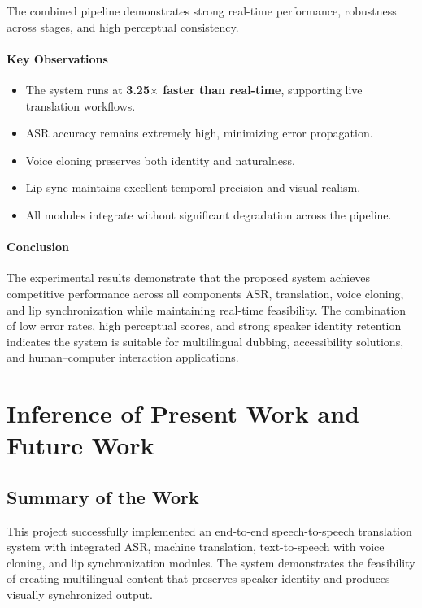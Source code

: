\documentclass[12pt,oneside]{report}
\begin{document}
The combined pipeline demonstrates strong real-time performance, robustness across stages, and high perceptual consistency.

\subsubsection*{Key Observations}

\begin{itemize}
    \item The system runs at \textbf{3.25$\times$ faster than real-time}, supporting live translation workflows.
    \item ASR accuracy remains extremely high, minimizing error propagation.
    \item Voice cloning preserves both identity and naturalness.
    \item Lip-sync maintains excellent temporal precision and visual realism.
    \item All modules integrate without significant degradation across the pipeline.
\end{itemize}

\subsubsection*{Conclusion}

The experimental results demonstrate that the proposed system achieves competitive performance across all components ASR, translation, voice cloning, and lip synchronization while maintaining real-time feasibility. The combination of low error rates, high perceptual scores, and strong speaker identity retention indicates the system is suitable for multilingual dubbing, accessibility solutions, and human–computer interaction applications.




\chapter{Inference of Present Work and Future Work}
\label{ch:conclusion}

\section{Summary of the Work}

This project successfully implemented an end-to-end speech-to-speech translation system with integrated ASR, machine translation, text-to-speech with voice cloning, and lip synchronization modules. The system demonstrates the feasibility of creating multilingual content that preserves speaker identity and produces visually synchronized output.
\end{document}

